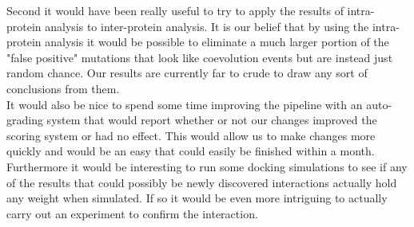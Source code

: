 \documentclass[11pt]{article}
\begin{document}
Second it would have been really useful to try to apply the results of
intra-protein analysis to inter-protein analysis. It is our belief
that by using the intra-protein analysis it would be possible to
eliminate a much larger portion of the "false positive" mutations that
look like coevolution events but are instead just random chance. Our
results are currently far to crude to draw any sort of conclusions
from them. \\

It would also be nice to spend some time improving the pipeline with
an auto-grading system that would report whether or not our changes
improved the scoring system or had no effect. This would allow us to
make changes more quickly and would be an easy that could easily be
finished within a month. \\

Furthermore it would be interesting to run some docking simulations to
see if any of the results that could possibly be newly discovered
interactions actually hold any weight when simulated. If so it would
be even more intriguing to actually carry out an experiment to confirm
the interaction.
\end{document}
